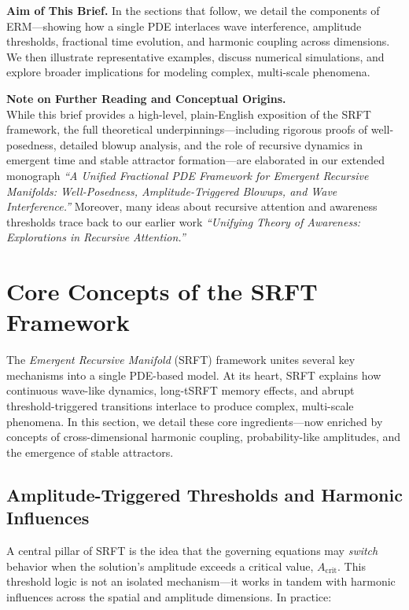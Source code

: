 \documentclass[12pt]{article}
\begin{document}
\medskip

\noindent
\textbf{Aim of This Brief.}  
In the sections that follow, we detail the components of ERM—showing how a single PDE interlaces wave interference, amplitude thresholds, fractional time evolution, and harmonic coupling across dimensions. We then illustrate representative examples, discuss numerical simulations, and explore broader implications for modeling complex, multi-scale phenomena.

\medskip

\noindent
\textbf{Note on Further Reading and Conceptual Origins.}\\
While this brief provides a high-level, plain-English exposition of the SRFT framework, the full theoretical underpinnings—including rigorous proofs of well-posedness, detailed blowup analysis, and the role of recursive dynamics in emergent time and stable attractor formation—are elaborated in our extended monograph \emph{``A Unified Fractional PDE Framework for Emergent Recursive Manifolds: Well-Posedness, Amplitude-Triggered Blowups, and Wave Interference.''} Moreover, many ideas about recursive attention and awareness thresholds trace back to our earlier work \emph{``Unifying Theory of Awareness: Explorations in Recursive Attention.''}

\section{Core Concepts of the SRFT Framework}
\label{sec:core_concepts}

The \emph{Emergent Recursive Manifold} (SRFT) framework unites several key mechanisms into a single PDE-based model. At its heart, SRFT explains how continuous wave-like dynamics, long-tSRFT memory effects, and abrupt threshold-triggered transitions interlace to produce complex, multi-scale phenomena. In this section, we detail these core ingredients—now enriched by concepts of cross-dimensional harmonic coupling, probability-like amplitudes, and the emergence of stable attractors.

\medskip

\subsection{Amplitude-Triggered Thresholds and Harmonic Influences}
A central pillar of SRFT is the idea that the governing equations may \emph{switch} behavior when the solution’s amplitude exceeds a critical value, $A_{\mathrm{crit}}$. This threshold logic is not an isolated mechanism—it works in tandem with harmonic influences across the spatial and amplitude dimensions. In practice:
\end{document}
